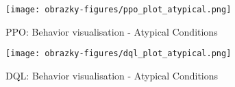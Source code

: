 \begin{figure}[ht]
    \centering
    \begin{minipage}{0.49\linewidth}
        \texttt{[image: obrazky-figures/ppo\_plot\_atypical.png]}
        \caption{PPO: Behavior visualisation - Atypical Conditions}
        \label{fig:ppo_atypical}
    \end{minipage}\hfill
    \begin{minipage}{0.49\linewidth}
        \texttt{[image: obrazky-figures/dql\_plot\_atypical.png]}
        \caption{DQL: Behavior visualisation - Atypical Conditions}
        \label{fig:dql_atypical}
    \end{minipage}
\end{figure}

